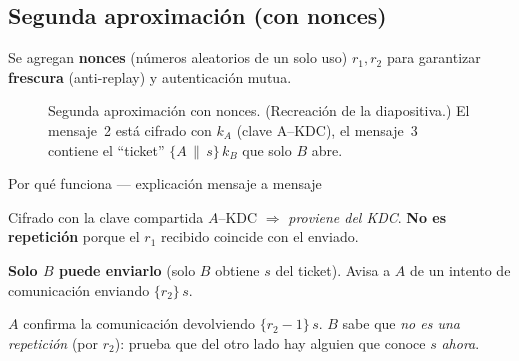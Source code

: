\documentclass[11pt,a4paper]{article}
\newcommand{\enc}[2]{\{#1\}\,#2}          %
\newcommand{\concat}{\,\|\,}
\begin{document}
\subsection{Segunda aproximación (con nonces)}

Se agregan \textbf{nonces} (números aleatorios de un solo uso) $r_1, r_2$ para garantizar
\textbf{frescura} (anti-replay) y autenticación mutua.

\begin{figure}[h]
\centering
{}
\caption{Segunda aproximación con nonces. (Recreación de la diapositiva.) El mensaje~2 está
cifrado con $k_A$ (clave A--KDC), el mensaje~3 contiene el ``ticket'' $\enc{A\concat s}{k_B}$
que solo $B$ abre.}
\end{figure}

\begin{defbox}{Por qué funciona — explicación mensaje a mensaje}
\begin{description}[leftmargin=2.4em,style=nextline,itemsep=2pt]
  \item[Segundo mensaje] Cifrado con la clave compartida $A$--KDC $\Rightarrow$ \emph{proviene
        del KDC}. \textbf{No es repetición} porque el $r_1$ recibido coincide con el enviado.
  \item[Cuarto mensaje] \textbf{Solo $B$ puede enviarlo} (solo $B$ obtiene $s$ del ticket).
        Avisa a $A$ de un intento de comunicación enviando $\enc{r_2}{s}$.
  \item[Quinto mensaje] $A$ confirma la comunicación devolviendo $\enc{r_2-1}{s}$. $B$ sabe
        que \emph{no es una repetición} (por $r_2$): prueba que del otro lado hay alguien que
        conoce $s$ \emph{ahora}.
\end{description}
\end{defbox}
\end{document}
